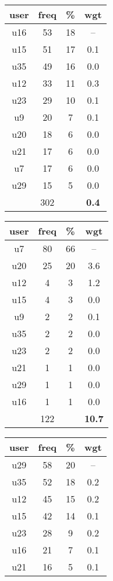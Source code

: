\begin{appendices}
\begin{table}
\begin{tabular}{ |c|c|c|c| }
	\hline
	\textbf{user} & \textbf{freq} & \textbf{\%} & \textbf{wgt} \\
	\hline
	u16 & 53 & 18 & -- \\
	u15 & 51 & 17 & 0.1 \\
	u35 & 49 & 16 & 0.0 \\
	u12 & 33 & 11 & 0.3 \\
	u23 & 29 & 10 & 0.1 \\
	u9 & 20 & 7 & 0.1 \\
	u20 & 18 & 6 & 0.0 \\
	u21 & 17 & 6 & 0.0 \\
	u7 & 17 & 6 & 0.0 \\
	u29 & 15 & 5 & 0.0 \\
	 & 302 & & \textbf{0.4} \\
	\hline
\end{tabular}
\begin{tabular}{ |c|c|c|c| }
	\hline
	\textbf{user} & \textbf{freq} & \textbf{\%} & \textbf{wgt} \\
	\hline
	u7 & 80 & 66 & -- \\
	u20 & 25 & 20 & 3.6 \\
	u12 & 4 & 3 & 1.2 \\
	u15 & 4 & 3 & 0.0 \\
	u9 & 2 & 2 & 0.1 \\
	u35 & 2 & 2 & 0.0 \\
	u23 & 2 & 2 & 0.0 \\
	u21 & 1 & 1 & 0.0 \\
	u29 & 1 & 1 & 0.0 \\
	u16 & 1 & 1 & 0.0 \\
	 & 122 & & \textbf{10.7} \\
	\hline
\end{tabular}
\begin{tabular}{ |c|c|c|c| }
	\hline
	\textbf{user} & \textbf{freq} & \textbf{\%} & \textbf{wgt} \\
	\hline
	u29 & 58 & 20 & -- \\
	u35 & 52 & 18 & 0.2 \\
	u12 & 45 & 15 & 0.2 \\
	u15 & 42 & 14 & 0.1 \\
	u23 & 28 & 9 & 0.2 \\
	u16 & 21 & 7 & 0.1 \\
	u21 & 16 & 5 & 0.1 \\

\end{tabular}
\end{table}
\end{appendices}
